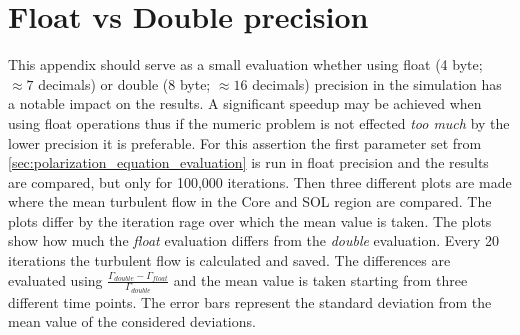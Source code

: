 \documentclass[master.tex]{subfiles}
\begin{document}
\chapter{Float vs Double precision} \label{sec:float-vs-double}
\renewcommand{\thechapter}{A}
This appendix should serve as a small evaluation whether using float (4 byte; $\approx 7$ decimals) or double (8 byte; $\approx 16$ decimals) precision in the simulation has a notable impact on the results. A significant speedup may be achieved when using float operations thus if the numeric problem is not effected \textit{too much} by the lower precision it is preferable.\newline
For this assertion the first parameter set from \autoref{sec:polarization_equation_evaluation} is run in float precision and the results are compared, but only for 100,000 iterations. Then three different plots are made where the mean turbulent flow in the Core and \ac{SOL} region are compared. The plots differ by the iteration rage over which the mean value is taken. The plots show how much the \textit{float} evaluation differs from the \textit{double} evaluation. Every 20 iterations the turbulent flow is calculated and saved. The differences are evaluated using $\frac{\Gamma_{double} - \Gamma_{float}}{\Gamma_{double}}$ and the mean value is taken starting from three different time points. The error bars represent the standard deviation from the mean value of the considered deviations. 
\end{document}
